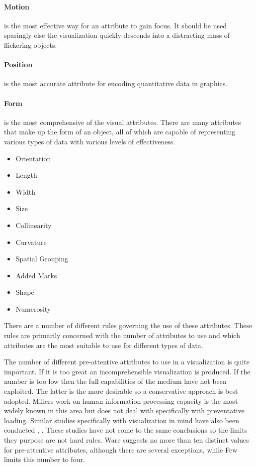 \documentclass[a4paper, 11pt, titlepage, onehalfspacing]{report}
\begin{document}
\paragraph{Motion} is the most effective way for an attribute to gain focus. It should be used sparingly else the visualization quickly descends into a distracting mass of flickering objects.

\paragraph{Position} is the most accurate attribute for encoding quantitative data in graphics.

\paragraph{Form} is the most comprehensive of the visual attributes. There are many attributes that make up the form of an object, all of which are capable of representing various types of data with various levels of effectiveness. 
\begin{itemize}
\item Orientation
\item Length
\item Width
\item Size
\item Collinearity
\item Curvature
\item Spatial Grouping
\item Added Marks
\item Shape
\item Numerosity
\end{itemize}


There are a number of different rules governing the use of these attributes. These rules are primarily concerned with the number of attributes to use and which attributes are the most suitable to use for different types of data.

The number of different pre-attentive attributes to use in a visualization is quite important. If it is too great an incomprehensible visualization is produced. If the number is too low then the full capabilities of the medium have not been exploited. The latter is the more desirable so a conservative approach is best adopted. Millers work on human information processing capacity \cite{Mil56} is the most widely known in this area but does not deal with specifically with preventative loading. Similar studies specifically with visualization in mind have also been conducted \cite{few2004show}, \cite{ware2012information}. These studies have not come to the same conclusions so the limits they purpose are not hard rules. Ware suggests no more than ten distinct values for pre-attentive attributes, although there are several exceptions, while Few limits this number to four.
\end{document}
